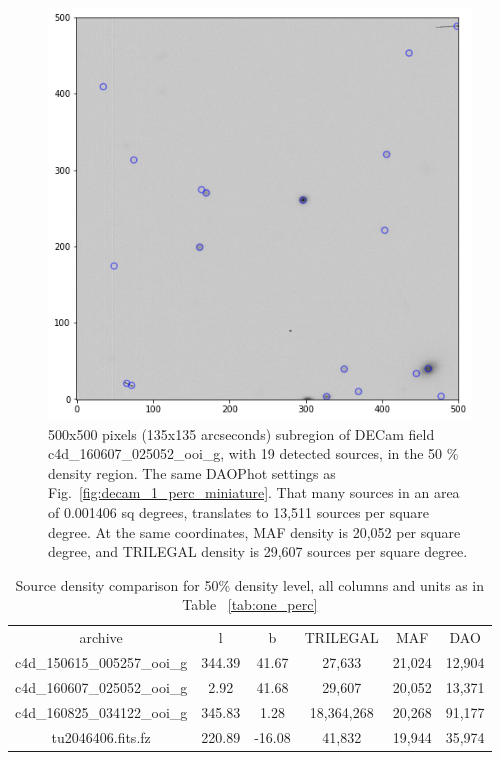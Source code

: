 \documentclass[DM,lsstdraft,toc,usenatbib]{lsstdoc}
\begin{document}
\begin{figure}
\begin{minipage}[t]{0.5\linewidth}
\includegraphics[width=\linewidth]{figs/c4d_160607_025052_ooi_g_v1_1_sub_500px.png}
\caption{500x500 pixels (135x135 arcseconds) subregion of DECam field c4d\_160607\_025052\_ooi\_g,  with 19  detected sources, in the  50 \% density region. The same DAOPhot settings as Fig.~\ref{fig:decam_1_perc_miniature}. That many sources in an area of 0.001406 sq degrees,  translates to 13,511 sources per square degree. At the same coordinates, MAF density is  20,052 per square degree, and TRILEGAL density is 29,607 sources per square degree.}
\label{fig:decam_20_perc_miniature}
\end{minipage}%
\end{figure}


\begin{table}
\begin{tabular}{cccccc}
archive & l & b & TRILEGAL & MAF & DAO \\
c4d\_150615\_005257\_ooi\_g & 344.39 & 41.67 & 27,633 & 21,024 & 12,904 \\
c4d\_160607\_025052\_ooi\_g & 2.92 & 41.68 & 29,607 & 20,052 & 13,371 \\
c4d\_160825\_034122\_ooi\_g & 345.83 & 1.28 & 18,364,268 & 20,268 & 91,177 \\
tu2046406.fits.fz & 220.89 & -16.08 & 41,832 & 19,944 & 35,974 \\
\end{tabular}
\caption{Source density comparison for 50\% density level, all columns and units as in Table ~\ref{tab:one_perc}}
\label{tab:fifty_perc}
\end{table}
\end{document}
